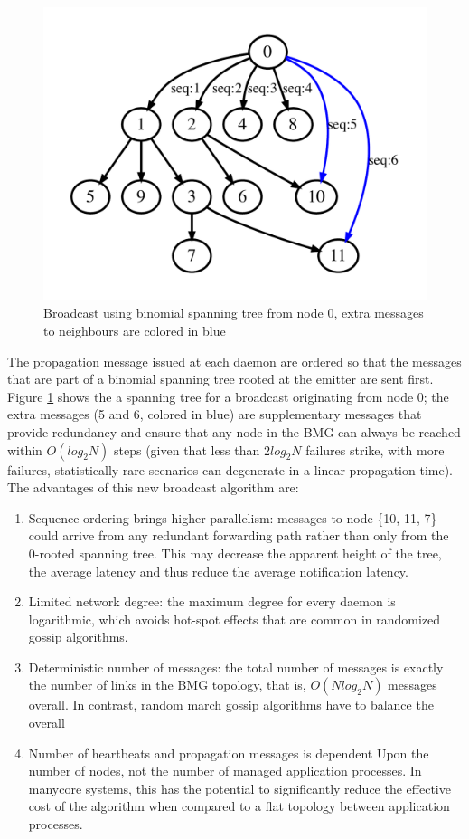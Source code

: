 \documentclass[sigconf]{acmart}
\begin{document}
\begin{figure}
  \centering
  \includegraphics[width=\linewidth]{reorder_span.pdf}
  \caption{Broadcast using binomial spanning tree from node 0, extra messages to neighbours are colored in blue }
  \label{fig:reorder_span}
\end{figure}

The propagation message issued at each daemon are ordered so that the 
messages that are part of a binomial spanning tree rooted at the emitter
are sent first. Figure \ref{fig:reorder_span} shows the a spanning tree
for a broadcast originating from node 0; the extra messages (5 and 6, colored 
in blue) are supplementary messages that provide redundancy and ensure that
any node in the BMG can always be reached within $O(log_2 N)$ steps (given 
that less than $2 log_2 N$ failures strike, with more failures, 
statistically rare scenarios can degenerate in a linear propagation time).
The advantages of this new broadcast algorithm are:
\begin{enumerate}
  \item Sequence ordering brings higher parallelism: messages to node \{10, 11, 7\} could arrive from any redundant forwarding path rather than only from the 0-rooted spanning tree. This may decrease the apparent height of the tree, the average latency and thus reduce the average notification latency.
  \item Limited network degree: the maximum degree for every daemon is logarithmic, which avoids hot-spot effects that are common in randomized gossip algorithms. 
  \item Deterministic number of messages: the total number of messages is 
  exactly the number of links in the BMG topology, that is, $O(N log_2 N)$ 
  messages overall. In contrast, random march gossip algorithms have to 
  balance the overall
  \item Number of heartbeats and propagation messages is dependent Upon
  the number of nodes, not the number of managed application processes.
  In manycore systems, this has the potential to significantly reduce the 
  effective cost of the algorithm when compared to a flat topology between 
  application processes. 
\end{enumerate}
\end{document}
